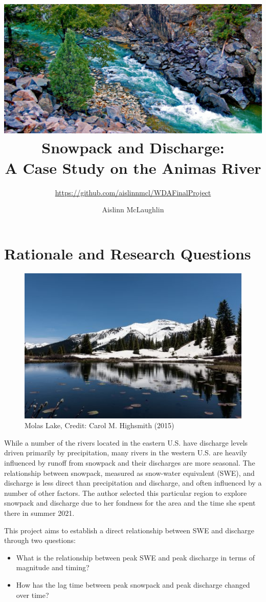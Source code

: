 \documentclass[
  12pt,
]{article}
\title{\includegraphics{animas_river.jpg}\\
Snowpack and Discharge:\\
A Case Study on the Animas River}
\subtitle{\url{https://github.com/aislinnmcl/WDAFinalProject}}
\author{Aislinn McLaughlin}
\date{}
\begin{document}
\maketitle

\newpage

\hypertarget{rationale-and-research-questions}{%
\section{Rationale and Research
Questions}\label{rationale-and-research-questions}}

\begin{figure}
\centering
\includegraphics{molas_lake.jpg}
\caption{Molas Lake, Credit: Carol M. Highsmith (2015)}
\end{figure}

While a number of the rivers located in the eastern U.S. have discharge
levels driven primarily by precipitation, many rivers in the western
U.S. are heavily influenced by runoff from snowpack and their discharges
are more seasonal. The relationship between snowpack, measured as
snow-water equivalent (SWE), and discharge is less direct than
precipitation and discharge, and often influenced by a number of other
factors. The author selected this particular region to explore snowpack
and discharge due to her fondness for the area and the time she spent
there in summer 2021.

This project aims to establish a direct relationship between SWE and
discharge through two questions:

\begin{itemize}
\item
  What is the relationship between peak SWE and peak discharge in terms
  of magnitude and timing?
\item
  How has the lag time between peak snowpack and peak discharge changed
  over time?
\end{itemize}
\end{document}
